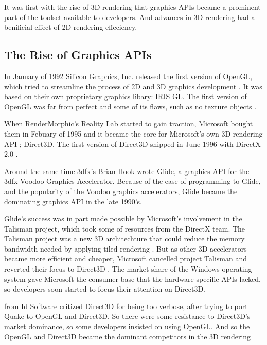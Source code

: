It was first with the rise of 3D rendering that graphics \glspl{API} became a prominent part of the toolset available to developers.
And advances in 3D rendering had a benificial effect of 2D rendering effeciency.


\subsection{The Rise of Graphics \acs{API}s} 

In January of 1992 Silicon Graphics, Inc. released the first version of OpenGL, which tried to streamline the process of 2D and 3D graphics development \cite{segal1994opengl}.
It was based on their own proprietary graphics libary: \gls{IRIS GL}.
The first version of OpenGL was far from perfect and some of its flaws, such as no texture objects \cite{kronos????history}.

When RenderMorphic's Reality Lab started to gain traction, Microsoft bought them in Febuary of 1995 and it became the core for Microsoft's own 3D rendering \gls{API} \cite{1997crushed}; Direct3D.
The first version of Direct3D shipped in June 1996 with DirectX 2.0 \cite{wikipedia????directx}. 

Around the same time 3dfx's Brian Hook wrote Glide, a graphics API for the 3dfx Voodoo Graphics Accelerator.
Because of the ease of programming to Glide, and the popularity of the Voodoo graphics accelerators, Glide became the dominating graphics \gls{API} in the late 1990's.

Glide's success was in part made possible by Microsoft's involvement in the Talisman project, which took some of resources from the DirectX team.
The Talisman project was a new 3D architechture that could reduce the memory bandwidth needed by applying tiled rendering \cite{torborg1996talisman}.
But as other 3D accelerators became more efficient and cheaper, Microsoft cancelled project Talisman and reverted their focus to Direct3D \cite{wikipedia????talisman}.
The market share of the Windows operating system gave Microsoft the consumer base that the hardware specific \glspl{API} lacked, so  developers soon started to focus their attention on Direct3D.

\citet{carmack1996plan} from Id Software critized Direct3D for being too verbose, after trying to port Quake to OpenGL and Direct3D.
So there were some resistance to Direct3D's market dominance, so some developers insisted on using OpenGL.
And so the OpenGL and Direct3D became the dominant competitors in the 3D rendering 

